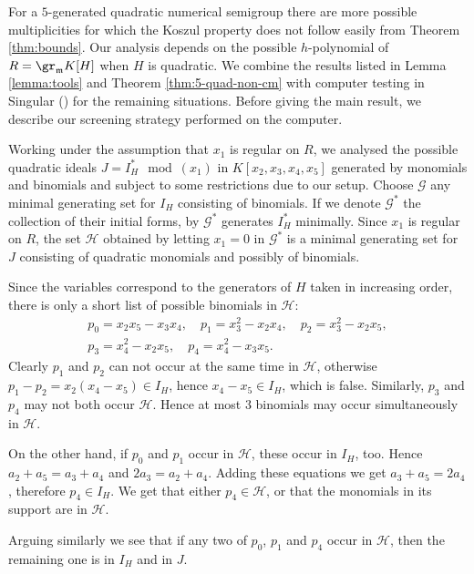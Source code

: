 \documentclass[12pt]{amsart}
\def\frk{\mathfrak}               %
\def\mm{{\frk m}}
\begin{document}
For  a $5$-generated quadratic numerical semigroup there are more possible multiplicities for which the Koszul
 property does not follow easily from Theorem \ref{thm:bounds}.
Our analysis depends on the possible $h$-polynomial of $R=\gr_\mm K[H]$ when $H$ is quadratic.
 We combine the results listed in Lemma \ref{lemma:tools} and Theorem \ref{thm:5-quad-non-cm}
 with computer testing in Singular (\cite{Sing}) for the remaining situations. 
Before giving the main result, we describe our screening strategy performed on the computer.
 
Working under  the assumption that $x_1$ is regular on $R$, 
we analysed the possible quadratic ideals  $J=I^*_H \mod (x_1)$ in $K[x_2, x_3, x_4, x_5]$ generated by monomials and binomials and subject to some restrictions due to our setup. 
Choose $\mathcal{G}$ any minimal generating set for $I_H$ consisting of binomials.
If we denote $\mathcal{G}^*$ the collection of their initial forms, by \cite[Lemma 1.5]{HeS-quad} $\mathcal{G}^*$  generates $I_H^*$ minimally.
Since $x_1$ is regular on $R$, the set $\mathcal{H}$ obtained by letting $x_1=0$ in $\mathcal{G}^*$ is a minimal generating set for $J$ consisting of 
quadratic monomials and possibly of binomials.
 
Since the variables correspond to the generators of $H$ taken in increasing order, there is only a short list of  possible binomials in $\mathcal{H}$: 
\begin{eqnarray*}
p_0=x_2x_5 -x_3x_4, \quad p_1=x_3^2-x_2x_4, \quad p_2=x_3^2-x_2x_5, \\ 
p_3 = x_4^2-x_2 x_5,\quad p_4=x_4^2-x_3x_5. \quad \quad\quad \quad
\end{eqnarray*}
Clearly $p_1$ and $p_2$ can not occur at the same time in $\mathcal{H}$, otherwise $p_1-p_2=x_2(x_4-x_5) \in I_H$, hence $x_4-x_5 \in I_H$, which is false.
Similarly, $p_3$ and $p_4$ may not both occur $\mathcal{H}$. Hence at most $3$ binomials may occur simultaneously in $\mathcal{H}$.



On the other hand, if $p_0$ and $p_1$ occur in $\mathcal{H}$, these occur in $I_H$, too. Hence $a_2+a_5=a_3+a_4$ and $2a_3=a_2+a_4$. Adding these equations we get 
 $a_3+a_5=2a_4$, therefore $p_4 \in I_H$. We get that either  $p_4 \in \mathcal{H}$, or that the monomials in its support are in $\mathcal{H}$.

Arguing similarly we see that if any two of $p_0$, $p_1$ and $p_4$ occur  in $\mathcal{H}$, then the remaining one is in $I_H$ and in $J$.
\end{document}

